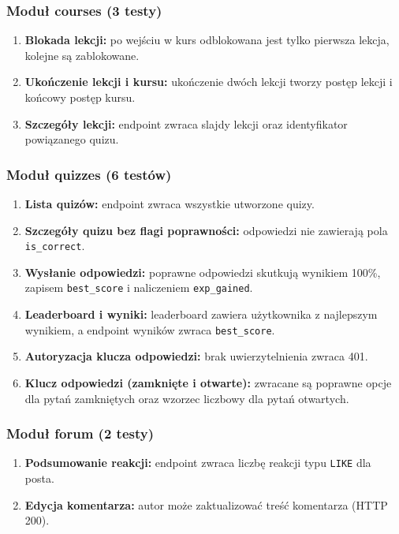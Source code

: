 \documentclass[11pt,a4paper]{article}
\numberwithin{equation}{section}
\begin{document}
\subsubsection*{Moduł courses (3 testy)}
\begin{enumerate}
    \item \textbf{Blokada lekcji:} po wejściu w kurs odblokowana jest tylko pierwsza lekcja, kolejne są zablokowane.
    \item \textbf{Ukończenie lekcji i kursu:} ukończenie dwóch lekcji tworzy postęp lekcji i końcowy postęp kursu.
    \item \textbf{Szczegóły lekcji:} endpoint zwraca slajdy lekcji oraz identyfikator powiązanego quizu.
\end{enumerate}

\subsubsection*{Moduł quizzes (6 testów)}
\begin{enumerate}
    \item \textbf{Lista quizów:} endpoint zwraca wszystkie utworzone quizy.
    \item \textbf{Szczegóły quizu bez flagi poprawności:} odpowiedzi nie zawierają pola \texttt{is\_correct}.
    \item \textbf{Wysłanie odpowiedzi:} poprawne odpowiedzi skutkują wynikiem 100\%, zapisem \texttt{best\_score} i naliczeniem \texttt{exp\_gained}.
    \item \textbf{Leaderboard i wyniki:} leaderboard zawiera użytkownika z najlepszym wynikiem, a endpoint wyników zwraca \texttt{best\_score}.
    \item \textbf{Autoryzacja klucza odpowiedzi:} brak uwierzytelnienia zwraca 401.
    \item \textbf{Klucz odpowiedzi (zamknięte i otwarte):} zwracane są poprawne opcje dla pytań zamkniętych oraz wzorzec liczbowy dla pytań otwartych.
\end{enumerate}

\subsubsection*{Moduł forum (2 testy)}
\begin{enumerate}
    \item \textbf{Podsumowanie reakcji:} endpoint zwraca liczbę reakcji typu \texttt{LIKE} dla posta.
    \item \textbf{Edycja komentarza:} autor może zaktualizować treść komentarza (HTTP 200).
\end{enumerate}
\end{document}
